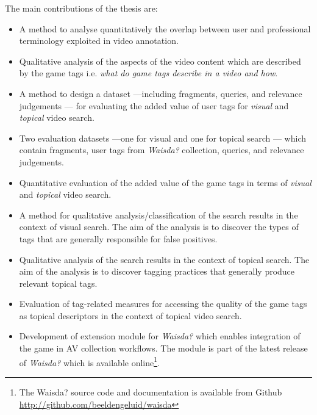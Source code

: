 The main contributions of the thesis are:
\begin{itemize}
\item A method to analyse quantitatively the overlap between user and professional terminology exploited in video annotation.
\item Qualitative analysis of the aspects of the video content which are described by the game tags i.e. \textit{what do game tags describe in a video and how}.
\item A method to design a dataset ---including fragments, queries, and relevance judgements --- for evaluating the added value of user tags for \textit{visual} and \textit{topical} video search.
\item Two evaluation datasets ---one for visual and one for topical search --- which contain fragments, user tags from \textit{Waisda?} collection, queries, and relevance judgements.
\item Quantitative evaluation of the added value of the game tags in terms of \textit{visual} and \textit{topical} video search.

\item A method for qualitative analysis/classification of the search results in the context of visual search. The aim of the analysis is to discover the types of tags that are generally responsible for false positives.

\item Qualitative analysis of the search results in the context of topical search. The aim of the analysis is to discover tagging practices that generally produce relevant topical tags.

\item Evaluation of tag-related measures for accessing the quality of the game tags as topical descriptors in the context of topical video search.

\item Development of extension module for \textit{Waisda?} which enables integration of the game in AV collection workflows. The module is part of the latest release of \textit{Waisda?} which is available online\footnote{The Waisda? source code and documentation is available from Github \url{http://github.com/beeldengeluid/waisda}}.
\end{itemize}

